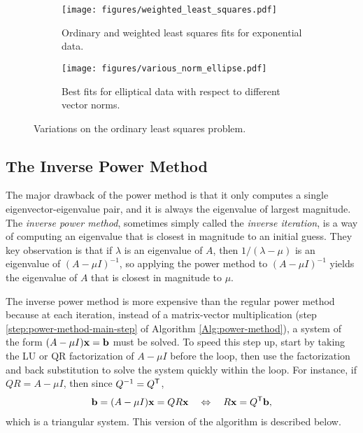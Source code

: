 \begin{figure}[H] %
\captionsetup[subfigure]{justification=centering}
\centering
\begin{subfigure}{.49\textwidth}
    \centering
    \texttt{[image: figures/weighted\_least\_squares.pdf]}
    \caption{Ordinary and weighted least squares fits for exponential data.}
    \label{fig:lstsq-ols-vs-wls}
\end{subfigure}
%
\begin{subfigure}{.49\textwidth}
    \centering
    \texttt{[image: figures/various\_norm\_ellipse.pdf]}
    \caption{Best fits for elliptical data with respect to different vector norms.}
    \label{fig:lstsq-different-norms}
\end{subfigure}
\caption{Variations on the ordinary least squares problem.}
\end{figure}

\subsection*{The Inverse Power Method} %

The major drawback of the power method is that it only computes a single eigenvector-eigenvalue pair, and it is always the eigenvalue of largest magnitude.
The \emph{inverse power method}, sometimes simply called the \emph{inverse iteration}, is a way of computing an eigenvalue that is closest in magnitude to an initial guess.
They key observation is that if $\lambda$ is an eigenvalue of $A$, then $1/(\lambda - \mu)$ is an eigenvalue of $(A - \mu I)^{-1}$, so applying the power method to $(A - \mu I)^{-1}$ yields the eigenvalue of $A$ that is closest in magnitude to $\mu$.

The inverse power method is more expensive than the regular power method because at each iteration, instead of a matrix-vector multiplication (step \ref{step:power-method-main-step} of Algorithm \ref{Alg:power-method}), a system of the form $(A - \mu I)\mathbf{x} = \mathbf{b}$ must be solved.
To speed this step up, start by taking the LU or QR factorization of $A - \mu I$ before the loop, then use the factorization and back substitution to solve the system quickly within the loop.
For instance, if $QR = A - \mu I$, then since $Q^{-1} = Q^{\mathsf T}$,
\begin{align*}
    \mathbf{b}
    = (A-\mu I)\mathbf{x}
    = QR\mathbf{x}
    \quad\Leftrightarrow\quad
    R\mathbf{x} = Q^{\mathsf T}\mathbf{b},
\end{align*}
which is a triangular system.
This version of the algorithm is described below.

